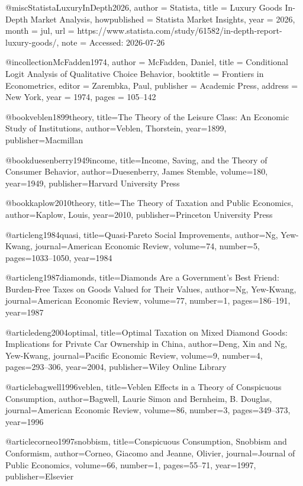 
 @misc{StatistaLuxuryInDepth2026,
   author       = {{Statista}},
  title        = {Luxury Goods In-Depth Market Analysis},
   howpublished = {Statista Market Insights},
   year         = {2026},
   month        = jul,
   url          = {https://www.statista.com/study/61582/in-depth-report-luxury-goods/},
   note         = {Accessed: 2026-07-26}
 }


@incollection{McFadden1974,
  author    = {McFadden, Daniel},
  title     = {Conditional Logit Analysis of Qualitative Choice Behavior},
  booktitle = {Frontiers in Econometrics},
  editor    = {Zarembka, Paul},
  publisher = {Academic Press},
  address   = {New York},
  year      = {1974},
  pages     = {105--142}
}

@book{veblen1899theory,
  title={The Theory of the Leisure Class: An Economic Study of Institutions},
  author={Veblen, Thorstein},
  year={1899},
  publisher={Macmillan}
}

@book{duesenberry1949income,
  title={Income, Saving, and the Theory of Consumer Behavior},
  author={Duesenberry, James Stemble},
  volume={180},
  year={1949},
  publisher={Harvard University Press}
}

@book{kaplow2010theory,
  title={The Theory of Taxation and Public Economics},
  author={Kaplow, Louis},
  year={2010},
  publisher={Princeton University Press}
}

@article{ng1984quasi,
  title={Quasi-Pareto Social Improvements},
  author={Ng, Yew-Kwang},
  journal={American Economic Review},
  volume={74},
  number={5},
  pages={1033--1050},
  year={1984}
}

@article{ng1987diamonds,
  title={Diamonds Are a Government's Best Friend: Burden-Free Taxes on Goods Valued for Their Values},
  author={Ng, Yew-Kwang},
  journal={American Economic Review},
  volume={77},
  number={1},
  pages={186--191},
  year={1987}
}

@article{deng2004optimal,
  title={Optimal Taxation on Mixed Diamond Goods: Implications for Private Car Ownership in China},
  author={Deng, Xin and Ng, Yew-Kwang},
  journal={Pacific Economic Review},
  volume={9},
  number={4},
  pages={293--306},
  year={2004},
  publisher={Wiley Online Library}
}

@article{bagwell1996veblen,
  title={Veblen Effects in a Theory of Conspicuous Consumption},
  author={Bagwell, Laurie Simon and Bernheim, B. Douglas},
  journal={American Economic Review},
  volume={86},
  number={3},
  pages={349--373},
  year={1996}
}

@article{corneo1997snobbism,
  title={Conspicuous Consumption, Snobbism and Conformism},
  author={Corneo, Giacomo and Jeanne, Olivier},
  journal={Journal of Public Economics},
  volume={66},
  number={1},
  pages={55--71},
  year={1997},
  publisher={Elsevier}
}

